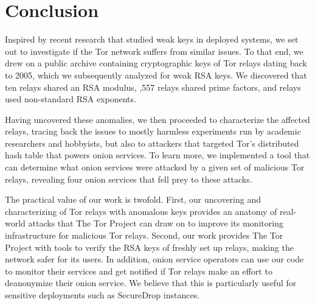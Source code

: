 \section{Conclusion}
\label{sec:conclusion}

Inspired by recent research that studied weak keys in deployed systems, we set
out to investigate if the Tor network suffers from similar issues.  To that
end, we drew on a public archive containing cryptographic keys of Tor relays
dating back to 2005, which we subsequently analyzed for weak RSA keys.  We
discovered that \first ten relays shared an RSA modulus, ,557 relays
shared prime factors, and  relays used non-standard RSA exponents.

Having uncovered these anomalies, we then proceeded to characterize the
affected relays, tracing back the issues to mostly harmless experiments run by
academic researchers and hobbyists, but also to attackers that targeted Tor's
distributed hash table that powers onion services.  To learn more, we
implemented a tool that can determine what onion services were attacked by a
given set of malicious Tor relays, revealing four onion services that fell prey
to these attacks.

The practical value of our work is twofold.  First, our uncovering and
characterizing of Tor relays with anomalous keys provides an anatomy of
real-world attacks that The Tor Project can draw on to improve its monitoring
infrastructure for malicious Tor relays.  Second, our work provides The Tor
Project with tools to verify the RSA keys of freshly set up relays, making the
network safer for its users.  In addition, onion service operators can use our
code to monitor their services and get notified if Tor relays make an effort to
deanonymize their onion service.  We believe that this is particularly useful
for sensitive deployments such as SecureDrop instances.
